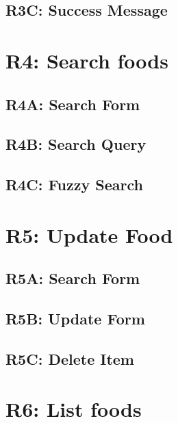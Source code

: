 \documentclass[
]{article}
\begin{document}
\hypertarget{r3c-success-message}{%
\subsection{R3C: Success Message}\label{r3c-success-message}}

\hypertarget{r4-search-foods}{%
\section{R4: Search foods}\label{r4-search-foods}}

\hypertarget{r4a-search-form}{%
\subsection{R4A: Search Form}\label{r4a-search-form}}

\hypertarget{r4b-search-query}{%
\subsection{R4B: Search Query}\label{r4b-search-query}}

\hypertarget{r4c-fuzzy-search}{%
\subsection{R4C: Fuzzy Search}\label{r4c-fuzzy-search}}

\hypertarget{r5-update-food}{%
\section{R5: Update Food}\label{r5-update-food}}

\hypertarget{r5a-search-form}{%
\subsection{R5A: Search Form}\label{r5a-search-form}}

\hypertarget{r5b-update-form}{%
\subsection{R5B: Update Form}\label{r5b-update-form}}

\hypertarget{r5c-delete-item}{%
\subsection{R5C: Delete Item}\label{r5c-delete-item}}

\hypertarget{r6-list-foods}{%
\section{R6: List foods}\label{r6-list-foods}}
\end{document}
